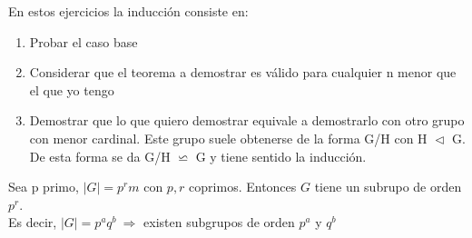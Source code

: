 \documentclass[nochap]{apuntes}
\begin{document}
\begin{defn}[Inducción]
 En estos ejercicios la inducción consiste en:
 \begin{enumerate}
  \item Probar el caso base
  \item Considerar que el teorema a demostrar es válido para cualquier n menor que el que yo tengo
  \item Demostrar que lo que quiero demostrar equivale a demostrarlo con otro grupo con menor cardinal. Este grupo suele obtenerse
  de la forma G/H con H $\vartriangleleft$ G. De esta forma se da G/H $\backsimeq$ G y tiene sentido la inducción.
 \end{enumerate}
\end{defn}


\begin{theorem}
 Sea p primo, $|G|=p^{r}m$  con $p, r$ coprimos. Entonces $G$ tiene un subrupo de orden $p^{r}$.\\
 Es decir, $|G|=p^{a}q^{b} \ \Rightarrow$  existen subgrupos de orden $p^{a}$  y $q^{b}$
\end{theorem}
\end{document}
